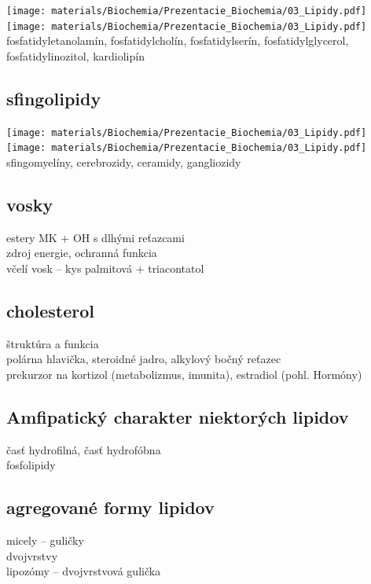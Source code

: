 \texttt{[image: materials/Biochemia/Prezentacie\_Biochemia/03\_Lipidy.pdf]}
\texttt{[image: materials/Biochemia/Prezentacie\_Biochemia/03\_Lipidy.pdf]}
\\
fosfatidyletanolamín, fosfatidylcholín, fosfatidylserín, fosfatidylglycerol, fosfatidylinozitol, kardiolipín\\

\subsection*{sfingolipidy}

\texttt{[image: materials/Biochemia/Prezentacie\_Biochemia/03\_Lipidy.pdf]}
\texttt{[image: materials/Biochemia/Prezentacie\_Biochemia/03\_Lipidy.pdf]}
\\
sfingomyelíny, cerebrozidy, ceramidy, gangliozidy\\

\subsection*{vosky}
estery MK + OH s dlhými reťazcami\\
zdroj energie, ochranná funkcia\\
včelí vosk -- kys palmitová + triacontatol\\

\subsection*{cholesterol}
štruktúra a funkcia\\
\tab polárna hlavička, steroidné jadro, alkylový bočný reťazec\\
\tab prekurzor na kortizol (metabolizmus, imunita), estradiol (pohl. Hormóny)\\

\subsection*{Amfipatický charakter niektorých lipidov}
časť hydrofilná, časť hydrofóbna\\
fosfolipidy\\
\subsection*{agregované formy lipidov}
micely -- guličky\\
dvojvrstvy\\
lipozómy -- dvojvrstvová gulička\\
